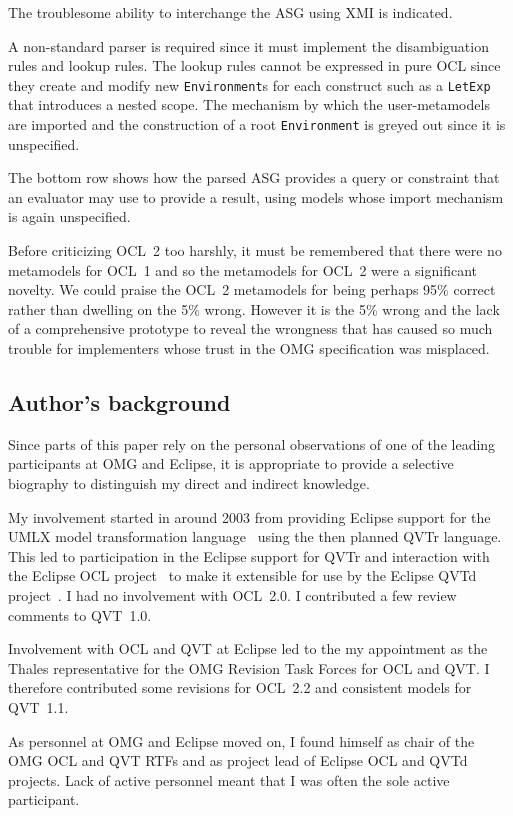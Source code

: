 \documentclass{jot}
\begin{document}
The troublesome ability to interchange the ASG using XMI is indicated.

A non-standard parser is required since it must implement the disambiguation rules and lookup rules. The lookup rules cannot be expressed in pure OCL since they create and modify new \verb$Environment$s for each construct such as a \verb$LetExp$ that introduces a nested scope. The mechanism by which the user-metamodels are imported and the construction of a root \verb$Environment$ is greyed out since it is unspecified.

The bottom row shows how the parsed ASG provides a query or constraint that an evaluator may use to provide a result, using models whose import mechanism is again unspecified.

Before criticizing OCL~2 too harshly, it must be remembered that there were no metamodels for OCL~1 and so the metamodels for OCL~2 were a significant novelty. We could praise the OCL~2 metamodels for being perhaps 95\% correct rather than dwelling on the 5\% wrong. However it is the 5\% wrong and the lack of a comprehensive prototype to reveal the wrongness that has caused so much trouble for implementers whose trust in the OMG specification was misplaced.

\subsection{Author's background}

Since parts of this paper rely on the personal observations of one of the leading participants at OMG and Eclipse, it is appropriate to provide a selective biography to distinguish my direct and indirect knowledge.

My involvement started in around 2003 from providing Eclipse support for the UMLX model transformation language~\cite{Willink-UMLX} using the then planned QVTr language. This led to participation in the Eclipse support for QVTr and interaction with the Eclipse OCL project~\cite{Eclipse-OCL} to make it extensible for use by the Eclipse QVTd project~\cite{Eclipse-QVTd}. I had no involvement with OCL~2.0. I contributed a few review comments to QVT~1.0.

Involvement with OCL and QVT at Eclipse led to the my appointment as the Thales representative for the OMG Revision Task Forces for OCL and QVT. I therefore contributed some revisions for OCL~2.2 and consistent models for QVT~1.1.

As personnel at OMG and Eclipse moved on, I found himself as chair of the OMG OCL and QVT RTFs and as project lead of Eclipse OCL and QVTd projects. Lack of active personnel meant that I was often the sole active participant.
\end{document}
